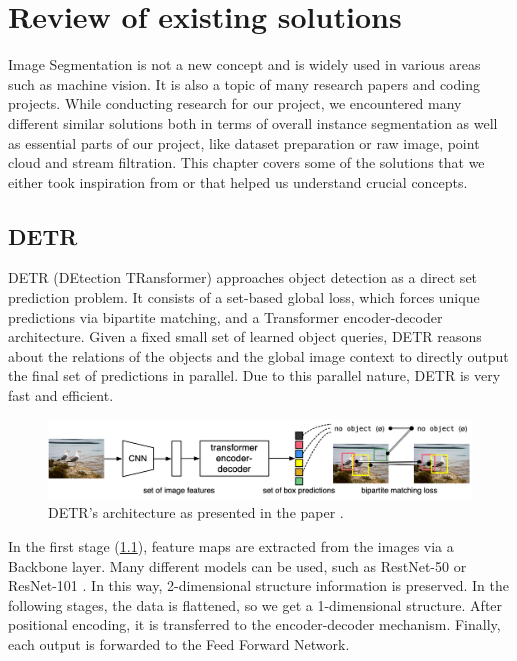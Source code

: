 \chapter{Review of existing solutions}
Image Segmentation is not a new concept and is widely used in various areas such as machine vision. It is also a topic of many research papers and coding projects. While conducting research for our project, we encountered many different similar solutions both in terms of overall instance segmentation as well as essential parts of our project, like dataset preparation or raw image, point cloud and stream filtration. This chapter covers some of the solutions that we either took inspiration from or that helped us understand crucial concepts.


\section{DETR}
DETR \cite{carion2020endtoend} (DEtection TRansformer) approaches object detection as a direct set prediction problem. It consists of a set-based global loss, which forces unique predictions via bipartite matching, and a Transformer encoder-decoder architecture. Given a fixed small set of learned object queries, DETR reasons about the relations of the objects and the global image context to directly output the final set of predictions in parallel. Due to this parallel nature, DETR is very fast and efficient.

\begin{figure}[ht]
    \centering
    \includegraphics[width=1.0\textwidth]{img/DETR.png}
    \caption{DETR's architecture as presented in the paper \cite{carion2020endtoend}.}
    \label{fig:detr-architecture}
\end{figure}


In the first stage (\cref{fig:detr-architecture}), feature maps are extracted from the images via a Backbone layer. Many different models can be used, such as RestNet-50 or ResNet-101 \cite{he2015deep}. In this way, 2-dimensional structure information is preserved. In the following stages, the data is flattened, so we get a 1-dimensional structure. After positional encoding, it is transferred to the encoder-decoder mechanism. Finally, each output is forwarded to the Feed Forward Network.

